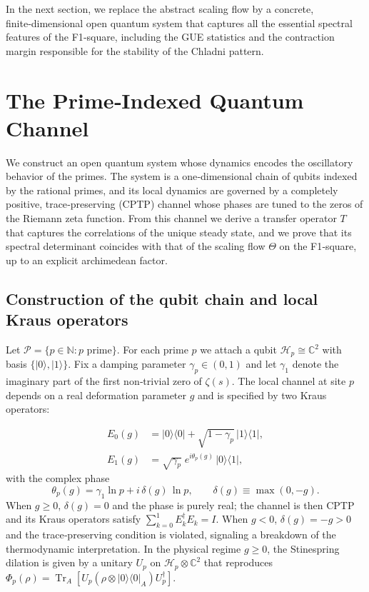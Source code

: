 \documentclass[11pt,a4paper]{article}
\newcommand{\ket}[1]{|#1\rangle}
\newcommand{\bra}[1]{\langle#1|}
\begin{document}
In the next section, we replace the abstract scaling flow by a concrete, finite‑dimensional open quantum system that captures all the essential spectral features of the F1‑square, including the GUE statistics and the contraction margin responsible for the stability of the Chladni pattern.

\section{The Prime‑Indexed Quantum Channel}
\label{sec:channel}

We construct an open quantum system whose dynamics encodes the oscillatory behavior of the primes.  The system is a one‑dimensional chain of qubits indexed by the rational primes, and its local dynamics are governed by a completely positive, trace‑preserving (CPTP) channel whose phases are tuned to the zeros of the Riemann zeta function.  From this channel we derive a transfer operator $T$ that captures the correlations of the unique steady state, and we prove that its spectral determinant coincides with that of the scaling flow $\Theta$ on the F1‑square, up to an explicit archimedean factor.

\subsection{Construction of the qubit chain and local Kraus operators}
\label{sec:channel-construction}

Let $\mathcal{P} = \{p\in\mathbb{N} : p\text{ prime}\}$.  For each prime $p$ we attach a qubit $\mathcal{H}_p\cong\mathbb{C}^2$ with basis $\{\ket{0},\ket{1}\}$.  Fix a damping parameter $\gamma_p\in(0,1)$ and let $\gamma_1$ denote the imaginary part of the first non‑trivial zero of $\zeta(s)$.  The local channel at site $p$ depends on a real deformation parameter $g$ and is specified by two Kraus operators:

\begin{align}
E_0(g) &= \ket{0}\bra{0} + \sqrt{1-\gamma_p}\,\ket{1}\bra{1}, \label{eq:E0-final}\\
E_1(g) &= \sqrt{\gamma_p}\; e^{i\theta_p(g)}\,\ket{0}\bra{1}, \label{eq:E1-final}
\end{align}
with the complex phase
\begin{equation}
\theta_p(g) = \gamma_1 \ln p + i\,\delta(g)\,\ln p, \qquad \delta(g) \equiv \max(0,-g).
\end{equation}
When $g\ge0$, $\delta(g)=0$ and the phase is purely real; the channel is then CPTP and its Kraus operators satisfy $\sum_{k=0}^1 E_k^\dagger E_k = I$.  When $g<0$, $\delta(g)=-g>0$ and the trace‑preserving condition is violated, signaling a breakdown of the thermodynamic interpretation.  In the physical regime $g\ge0$, the Stinespring dilation is given by a unitary $U_p$ on $\mathcal{H}_p\otimes\mathbb{C}^2$ that reproduces $\Phi_p(\rho)=\operatorname{Tr}_A[U_p(\rho\otimes\ket{0}\bra{0}_A)U_p^\dagger]$.
\end{document}
